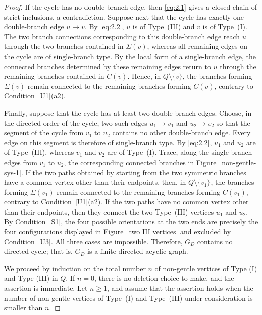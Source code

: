 \documentclass[11pt]{amsart}
\numberwithin{equation}{section}
\theoremstyle{definition}
\begin{document}
\begin{proof}
If the cycle has no double-branch edge, then \eqref{eq:2.1} gives a closed
chain of strict inclusions, a contradiction. Suppose next that the
cycle has exactly one double-branch edge $u\to v$. By \eqref{eq:2.2}, $u$ is
of Type~\textup{(III)} and $v$ is of Type~\textup{(I)}. The two
branch connections corresponding to this double-branch edge reach
$u$ through the two branches contained in $\Sigma(v)$, whereas all
remaining edges on the cycle are of single-branch type. By the
local form of a single-branch edge, the connected branches
determined by these remaining edges return to $u$ through the
remaining branches contained in $C(v)$. Hence, in
$Q\setminus\{v\}$, the branches forming $\Sigma(v)$ remain
connected to the remaining branches forming $C(v)$, contrary to
Condition~\ref{U1}\textup{(a2)}.

Finally, suppose that the cycle has at least two double-branch
edges. Choose, in the directed order of the cycle, two such edges
$u_1\longrightarrow v_1$ and
$u_2\longrightarrow v_2$
so that the segment of the cycle from $v_1$ to $u_2$ contains no
other double-branch edge. Every edge on this segment is therefore
of single-branch type. By \eqref{eq:2.2}, $u_1$ and $u_2$ are of
Type~\textup{(III)}, whereas $v_1$ and $v_2$ are of
Type~\textup{(I)}. Trace, along the single-branch edges from $v_1$
to $u_2$, the corresponding connected branches in
Figure~\ref{non-gentle-sys-1}. If the two paths obtained by
starting from the two symmetric branches have a common vertex
other than their endpoints, then, in $Q\setminus\{v_1\}$, the
branches forming $\Sigma(v_1)$ remain connected to the remaining
branches forming $C(v_1)$, contrary to
Condition~\ref{U1}\textup{(a2)}. If the two paths have no common
vertex other than their endpoints, then they connect the two
Type~\textup{(III)} vertices $u_1$ and $u_2$. By
Condition~\ref{S1}, the four possible orientations at the two ends
are precisely the four configurations displayed in
Figure~\ref{two III vertices} and excluded by
Condition~\ref{U3}. All three cases are impossible. Therefore,
$G_D$ contains no directed cycle; that is, $G_D$ is a finite
directed acyclic graph.

We proceed by induction on the total number $n$ of  non-gentle vertices of Type (I) and Type (III) in $Q$.
If $n=0$, there is no deletion choice to make, and the assertion is
immediate. Let $n\geq 1$, and assume that the assertion holds when
the number of non-gentle vertices of Type~\textup{(I)} and
Type~\textup{(III)} under consideration is smaller than $n$.


\end{proof}
\end{document}
